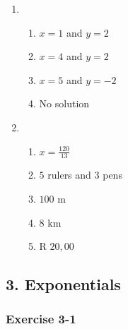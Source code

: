 {\begin{multicols}{3}
\begin{enumerate}[noitemsep, label=\textbf{\arabic*}. ]
\item %
\begin{enumerate}[noitemsep,label=\textbf{(\alph*)}]
\item $x=1$ and $y=2$%
\item $x=4$ and $y=2$%
\item $x=5$ and $y=-2$%
\item No solution%
\end{enumerate}

\item %
\begin{enumerate}[noitemsep,label=\textbf{(\alph*)}]
\item $x=\frac{120}{13}$%
\item $5$ rulers and $3$ pens%
\item $100$ m%
\item $8$ km%
\item R $20,00$%
   

\end{enumerate}
\end{enumerate}

\end{multicols}

\subsection* {3. Exponentials}
\begin{multicols}{3}
\subsubsection*{Exercise 3-1} %


\end{multicols}}
